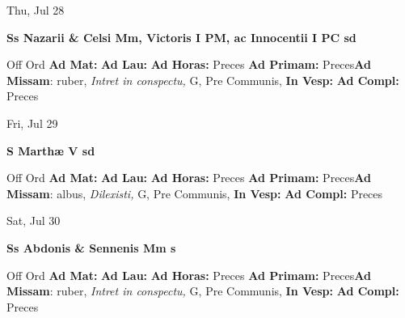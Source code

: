 \documentclass[10pt]{memoir}
\begin{document}
\begin{center}
\begin{minipage}{3.5in}
\vspace{2em}
\begin{center}Thu, Jul 28
\end{center}
\textbf{ \large Ss Nazarii \& Celsi Mm, Victoris I PM, ac Innocentii I PC
\textnormal{\normalsize sd}}

\begin{justify}Off Ord
\textbf{Ad Mat: }
\textbf{Ad Lau: }
\textbf{Ad Horas: }Preces
\textbf{Ad Primam: }Preces\textbf{Ad Missam}: ruber, \textit{Intret in conspectu,} G, Pre Communis, 
\textbf{In Vesp: }
\textbf{Ad Compl: }Preces
\end{justify}
\end{minipage}
\end{center}

\begin{center}
\begin{minipage}{3.5in}
\vspace{2em}
\begin{center}Fri, Jul 29
\end{center}
\textbf{ \large S Marthæ V
\textnormal{\normalsize sd}}

\begin{justify}Off Ord
\textbf{Ad Mat: }
\textbf{Ad Lau: }
\textbf{Ad Horas: }Preces
\textbf{Ad Primam: }Preces\textbf{Ad Missam}: albus, \textit{Dilexisti,} G, Pre Communis, 
\textbf{In Vesp: }
\textbf{Ad Compl: }Preces
\end{justify}
\end{minipage}
\end{center}

\begin{center}
\begin{minipage}{3.5in}
\vspace{2em}
\begin{center}Sat, Jul 30
\end{center}
\textbf{ \large Ss Abdonis \& Sennenis Mm
\textnormal{\normalsize s}}

\begin{justify}Off Ord
\textbf{Ad Mat: }
\textbf{Ad Lau: }
\textbf{Ad Horas: }Preces
\textbf{Ad Primam: }Preces\textbf{Ad Missam}: ruber, \textit{Intret in conspectu,} G, Pre Communis, 
\textbf{In Vesp: }
\textbf{Ad Compl: }Preces
\end{justify}
\end{minipage}
\end{center}
\end{document}

